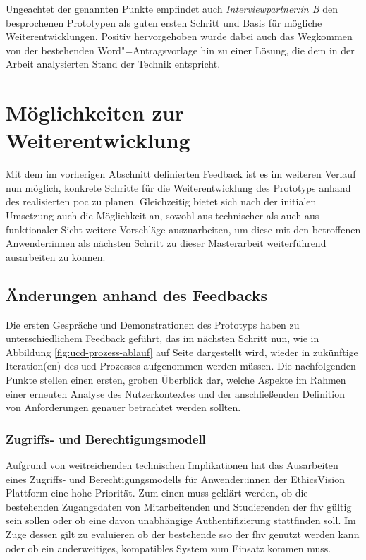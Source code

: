 \documentclass[a4paper,12pt,twoside]{scrreprt}
\begin{document}
Ungeachtet der genannten Punkte empfindet auch \textit{Interviewpartner:in B} den besprochenen Prototypen als guten ersten Schritt und Basis für mögliche Weiterentwicklungen. Positiv hervorgehoben wurde dabei auch das Wegkommen von der bestehenden Word"=Antragsvorlage hin zu einer Lösung, die dem in der Arbeit analysierten Stand der Technik entspricht.

\section{Möglichkeiten zur Weiterentwicklung}
\label{sec:möglichkeiten-weiterentwicklung}

Mit dem im vorherigen Abschnitt definierten Feedback ist es im weiteren Verlauf nun möglich, konkrete Schritte für die Weiterentwicklung des Prototyps anhand des realisierten \ac{poc} zu planen. Gleichzeitig bietet sich nach der initialen Umsetzung auch die Möglichkeit an, sowohl aus technischer als auch aus funktionaler Sicht weitere Vorschläge auszuarbeiten, um diese mit den betroffenen Anwender:innen als nächsten Schritt zu dieser Masterarbeit weiterführend ausarbeiten zu können.

\subsection{Änderungen anhand des Feedbacks}
\label{sub-sec:änderung-anhand-feedback}

Die ersten Gespräche und Demonstrationen des Prototyps haben zu unterschiedlichem Feedback geführt, das im nächsten Schritt nun, wie in Abbildung \ref{fig:ucd-prozess-ablauf} auf Seite \pageref{fig:ucd-prozess-ablauf} dargestellt wird, wieder in zukünftige Iteration(en) des \acl{ucd} Prozesses aufgenommen werden müssen. Die nachfolgenden Punkte stellen einen ersten, groben Überblick dar, welche Aspekte im Rahmen einer erneuten Analyse des Nutzerkontextes und der anschließenden Definition von Anforderungen genauer betrachtet werden sollten.

\subsubsection*{Zugriffs- und Berechtigungsmodell}
\label{sub-sub-sec:zugriffs-berechtigungsmodell}

Aufgrund von weitreichenden technischen Implikationen hat das Ausarbeiten eines Zugriffs- und Berechtigungsmodells für Anwender:innen der EthicsVision Plattform eine hohe Priorität. Zum einen muss geklärt werden, ob die bestehenden Zugangsdaten von Mitarbeitenden und Studierenden der \ac{fhv} gültig sein sollen oder ob eine davon unabhängige Authentifizierung stattfinden soll. Im Zuge dessen gilt zu evaluieren ob der bestehende \ac{sso} der \acl{fhv} genutzt werden kann oder ob ein anderweitiges, kompatibles System zum Einsatz kommen muss.
\end{document}
